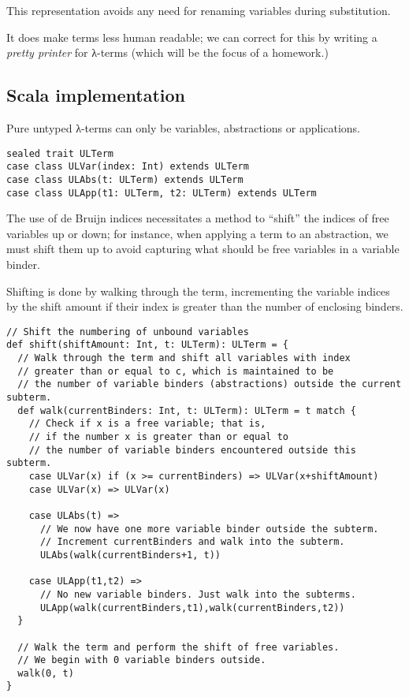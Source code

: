 \documentclass[11pt]{article}
\begin{document}
This representation avoids any need for renaming variables
during substitution.

It does make terms less human readable;
we can correct for this by writing a \emph{pretty printer} for λ-terms
(which will be the focus of a homework.)

\subsection*{Scala implementation}
\label{sec:org64cc022}
Pure untyped λ-terms can only be variables, abstractions or applications.
\begin{verbatim}
sealed trait ULTerm
case class ULVar(index: Int) extends ULTerm
case class ULAbs(t: ULTerm) extends ULTerm
case class ULApp(t1: ULTerm, t2: ULTerm) extends ULTerm
\end{verbatim}

The use of de Bruijn indices necessitates a method to
“shift” the indices of free variables up or down;
for instance, when applying a term to an abstraction,
we must shift them up to avoid capturing what should be free variables
in a variable binder.

Shifting is done by walking through the term,
incrementing the variable indices by the shift amount
if their index is greater than the number of enclosing binders.
\begin{verbatim}
// Shift the numbering of unbound variables
def shift(shiftAmount: Int, t: ULTerm): ULTerm = {
  // Walk through the term and shift all variables with index
  // greater than or equal to c, which is maintained to be
  // the number of variable binders (abstractions) outside the current subterm.
  def walk(currentBinders: Int, t: ULTerm): ULTerm = t match {
    // Check if x is a free variable; that is,
    // if the number x is greater than or equal to
    // the number of variable binders encountered outside this subterm.
    case ULVar(x) if (x >= currentBinders) => ULVar(x+shiftAmount)
    case ULVar(x) => ULVar(x)

    case ULAbs(t) =>
      // We now have one more variable binder outside the subterm.
      // Increment currentBinders and walk into the subterm.
      ULAbs(walk(currentBinders+1, t))

    case ULApp(t1,t2) =>
      // No new variable binders. Just walk into the subterms.
      ULApp(walk(currentBinders,t1),walk(currentBinders,t2))
  }

  // Walk the term and perform the shift of free variables.
  // We begin with 0 variable binders outside.
  walk(0, t)
}
\end{verbatim}
\end{document}

